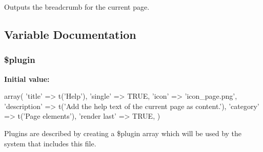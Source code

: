 Outputs the breadcrumb for the current page. 

\subsection{Variable Documentation}
\hypertarget{page__help_8inc_ada8a7130088351710bb02ed622d6bf65}{
\subsubsection[{\$plugin}]{\setlength{\rightskip}{0pt plus 5cm}\$plugin}}
\label{page__help_8inc_ada8a7130088351710bb02ed622d6bf65}
{\bfseries Initial value:}
\begin{DoxyCode}
 array(
  'title' => t('Help'),
  'single' => TRUE,
  'icon' => 'icon_page.png',
  'description' => t('Add the help text of the current page as content.'),
  'category' => t('Page elements'),
  'render last' => TRUE,
)
\end{DoxyCode}
Plugins are described by creating a \$plugin array which will be used by the system that includes this file. 
